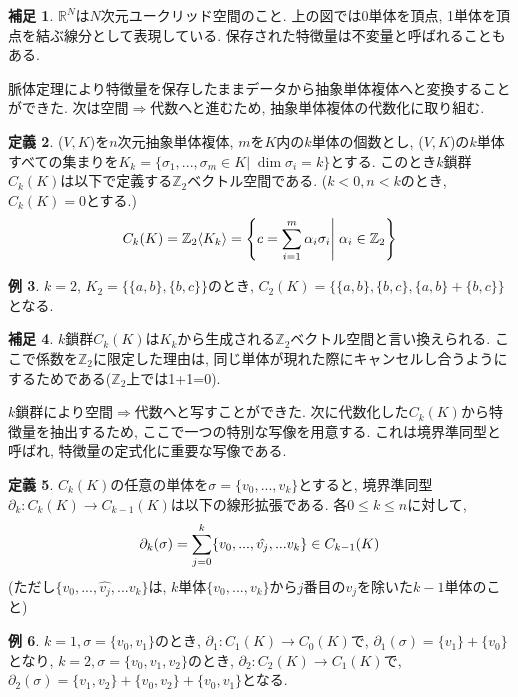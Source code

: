 \documentclass[a4paper]{jsarticle}
\theoremstyle{definition}
\newtheorem{dfn}{定義}[section]
\newtheorem{exam}[dfn]{例}
\newtheorem{hsk}[dfn]{補足}
\begin{document}
\begin{hsk}
$\mathbb{R}^N$は$N$次元ユークリッド空間のこと. 上の図では0単体を頂点, 1単体を頂点を結ぶ線分として表現している. 保存された特徴量は不変量と呼ばれることもある.\\    
\end{hsk}
脈体定理により特徴量を保存したままデータから抽象単体複体へと変換することができた. 次は空間$\Rightarrow$代数へと進むため, 抽象単体複体の代数化に取り組む. \\
\begin{dfn}
($V,K$)を$n$次元抽象単体複体, $m$を$K$内の$k$単体の個数とし, ($V,K$)の$k$単体すべての集まりを$K_k=\{\sigma_1,...,\sigma_m\in K | \; \dim\sigma_i=k \}$とする. このとき$k$鎖群$C_k(K)$は以下で定義する$\mathbb{Z}_2$ベクトル空間である. ($k<0, n<k$のとき, $C_k(K)=0$とする.)
\begin{equation}
   C_k(K)= \mathbb{Z}_2\langle K_k\rangle = \left\{ c=\sum_{i=1}^{m}\alpha_i\sigma_i \middle| \; \alpha_i\in\mathbb{Z}_2 \right\} 
 \notag
\end{equation}
\end{dfn}
\begin{exam}
    $k=2$, $K_2=\{ \{a,b\}, \{b,c\} \}$のとき, $C_2(K)=\{ \{a,b\}, \{b,c\}, \{a,b\}+\{b,c\} \}$となる.
\end{exam}
\begin{hsk}
    $k$鎖群$C_k(K)$は$K_k$から生成される$\mathbb{Z}_2$ベクトル空間と言い換えられる. ここで係数を$\mathbb{Z}_2$に限定した理由は, 同じ単体が現れた際にキャンセルし合うようにするためである($\mathbb{Z}_2$上では1+1=0).\\
\end{hsk}
    $k$鎖群により空間$\Rightarrow$代数へと写すことができた. 次に代数化した$C_k(K)$から特徴量を抽出するため, ここで一つの特別な写像を用意する. これは境界準同型と呼ばれ, 特徴量の定式化に重要な写像である.
\begin{dfn}
  $C_k(K)$の任意の単体を$\sigma=\{v_0,...,v_k\}$とすると, 境界準同型$\partial_k:C_k(K)\rightarrow C_{k-1}(K)$は以下の線形拡張である. 各$0\leq k\leq n$に対して, 
\begin{equation}
    \partial_k(\sigma)=\sum_{j=0}^{k} \{v_0,...,\hat{v_j},...v_k\} \in C_{k-1}(K) \notag
\end{equation}  
(ただし$\{v_0,...,\hat{v_j},...v_k\}$は, $k$単体$\{v_0,...,v_k\}$から$j$番目の$v_j$を除いた$k-1$単体のこと)
\end{dfn}  
\begin{exam}
    $k=1, \sigma=\{v_0,v_1\}$のとき, $\partial_1:C_1(K)\rightarrow C_0(K)$で, $\partial_1(\sigma)=\{v_1\}+\{v_0\}$となり, $k=2, \sigma=\{v_0,v_1,v_2\}$のとき, $\partial_2:C_2(K)\rightarrow C_1(K)$で, $\partial_2(\sigma)=\{v_1,v_2\}+\{v_0,v_2\}+\{v_0,v_1\}$となる. \\
\end{exam}  
\end{document}
